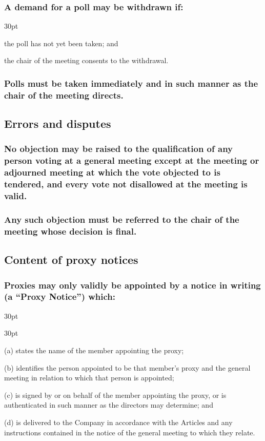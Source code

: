 \documentclass[12pt]{article}
\def\clauseindent{30pt}
\newenvironment{subindentpara}{\raggedright\begin{adjustwidth}{\clauseindent}{}\begin{hanginglist}}{\end{hanginglist}\end{adjustwidth}}
\newenvironment{subindentlist}{\raggedright\begin{adjustwidth}{\clauseindent}{}\begin{labeledlist}{\clauseindent}}{\end{labeledlist}\end{adjustwidth}}
\begin{document}
\subsubsection[Specifcs of withdrawal of poll demand]{A demand for a poll may be withdrawn if:}
\begin{subindentpara}
    \item the poll has not yet been taken; and
    \item the chair of the meeting consents to the withdrawal.
\end{subindentpara}
\subsubsection[Polls to be taken immediately]{Polls must be taken immediately and in such manner as the chair of the meeting directs.}

\subsection{Errors and disputes}
\subsubsection[Disputes and errors of qualification]{No objection may be raised to the qualification of any person voting at a general meeting except at the meeting or adjourned meeting at which the vote objected to is tendered, and every vote not disallowed at the meeting is valid.}
\subsubsection[Decisions on disputes and errors]{Any such objection must be referred to the chair of the meeting whose decision is final.}

\subsection{Content of proxy notices}
\subsubsection[Specifics of content of proxy notices]{Proxies may only validly be appointed by a notice in writing (a ``Proxy Notice'') which:}
\begin{subindentlist}
    \item [(a)] states the name of the member appointing the proxy;
    \item [(b)] identifies the person appointed to be that member's proxy and the general meeting in relation to which that person is appointed;
    \item [(c)] is signed by or on behalf of the member appointing the proxy, or is authenticated in such manner as the directors may determine; and
    \item [(d)] is delivered to the Company in accordance with the Articles and any instructions contained in the notice of the general meeting to which they relate.
\end{subindentlist}
\end{document}
